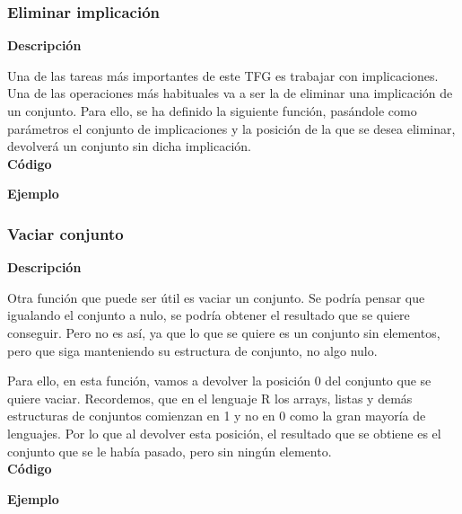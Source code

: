 

\subsubsection{Eliminar implicaci\'on}

    \textbf{Descripci\'on}

    Una de las tareas m\'as importantes de este TFG es trabajar con implicaciones. Una de las operaciones m\'as habituales 
    va a ser la de eliminar una implicaci\'on de un conjunto. Para ello, se ha definido la siguiente funci\'on, pas\'andole 
    como par\'ametros el conjunto de implicaciones y la posici\'on de la que se desea eliminar, devolver\'a un conjunto sin 
    dicha implicaci\'on.
    \\


    \textbf{C\'odigo}

    


    \textbf{Ejemplo}



\subsubsection{Vaciar conjunto}

    \textbf{Descripci\'on}

    Otra funci\'on que puede ser \'util es vaciar un conjunto. Se podr\'ia pensar que igualando el conjunto a nulo, 
    se podr\'ia obtener el resultado que se quiere conseguir. Pero no es as\'i, ya que lo que se quiere es un conjunto sin 
    elementos, pero que siga manteniendo su estructura de conjunto, no algo nulo. 
    
    Para ello, en esta funci\'on, vamos a devolver la posici\'on 0 del conjunto que se quiere vaciar. Recordemos, que en el 
    lenguaje R los arrays, listas y dem\'as estructuras de conjuntos comienzan en 1 y no en 0 como la gran mayor\'ia de lenguajes.
    Por lo que al devolver esta posici\'on, el resultado que se obtiene es el conjunto que se le hab\'ia pasado, pero sin ning\'un 
    elemento.
    \\


    \textbf{C\'odigo}

    

    \textbf{Ejemplo}



